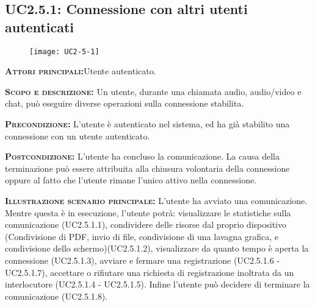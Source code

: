\subsection{UC2.5.1: Connessione con altri utenti autenticati}
\begin{figure}[H]
\begin{center}
\texttt{[image: UC2-5-1]}
\caption{}\label{fig:}
\end{center}
\end{figure}
\begin{description}
\item{\scshape\bfseries Attori principali:}Utente autenticato.
\item{\scshape\bfseries Scopo e descrizione:} Un utente, durante una chiamata audio, audio/video e chat, può eseguire diverse operazioni sulla connessione stabilita.
\item{\scshape\bfseries Precondizione:} L'utente è autenticato nel sistema, ed ha già stabilito una connessione con un utente autenticato.
\item{\scshape\bfseries Postcondizione:} L'utente ha concluso la comunicazione. La causa della terminazione può essere attribuita alla chiusura volontaria della connessione oppure al fatto che l'utente rimane l'unico attivo nella connessione.
\item{\scshape\bfseries Illustrazione scenario principale:} L'utente ha avviato una comunicazione. Mentre questa è in esecuzione, l'utente potrà: visualizzare le statistiche sulla comunicazione (UC2.5.1.1), condividere delle risorse dal proprio dispositivo (Condivisione di PDF, invio di file, condivisione di una lavagna grafica, e condivisione dello schermo)(UC2.5.1.2), visualizzare da quanto tempo è aperta la connessione (UC2.5.1.3), avviare e fermare una registrazione (UC2.5.1.6 - UC2.5.1.7), accettare o rifiutare una richiesta di registrazione inoltrata da un interlocutore (UC2.5.1.4 - UC2.5.1.5). Infine l'utente può decidere di terminare la comunicazione (UC2.5.1.8).
\end{description}

